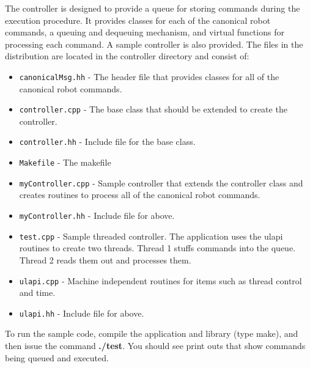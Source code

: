 The controller is designed to provide a queue for storing commands during the execution procedure. It provides classes for each of the canonical robot commands, a queuing and dequeuing mechanism, and virtual functions for processing each command. A sample controller is also provided. The files in the distribution are located in the controller directory and consist of:

\begin{itemize}
 \item \texttt{canonicalMsg.hh} - The header file that provides classes for all of the canonical robot commands.
 \item \texttt{controller.cpp} - The base class that should be extended to create the controller.
 \item \texttt{controller.hh} - Include file for the base class.
 \item \texttt{Makefile} - The makefile
 \item \texttt{myController.cpp} - Sample controller that extends the controller class and creates routines to process all of the canonical robot commands.
 \item \texttt{myController.hh} - Include file for above.
 \item \texttt{test.cpp} -  Sample threaded controller. The application uses the ulapi routines to create two threads. Thread 1 stuffs commands into the queue. Thread 2 reads them out and processes them.
 \item \texttt{ulapi.cpp} - Machine independent routines for items such as thread control and time.
 \item \texttt{ulapi.hh} -  Include file for above.
\end{itemize}

To run the sample code, compile the application and library (type make), and then issue the command \textbf{./test}. You should see print outs that show commands being queued and executed.